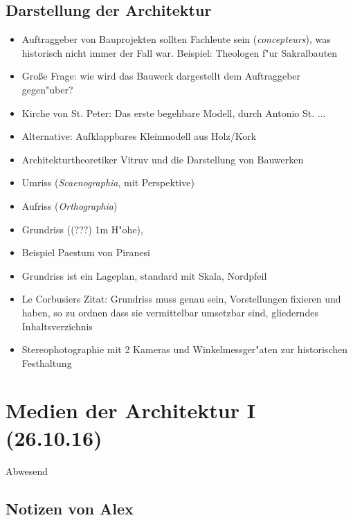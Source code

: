 \documentclass[emulatestandardclasses]{scrartcl}
\begin{document}
\subsection{Darstellung der Architektur}

\begin{itemize}
    \item Auftraggeber von Bauprojekten sollten Fachleute sein (\emph{concepteurs}), was historisch nicht immer der Fall war. Beispiel: Theologen f"ur Sakralbauten
    \item Gro\ss e Frage: wie wird das Bauwerk dargestellt dem Auftraggeber gegen"uber?
    \item Kirche von St. Peter: Das erste begehbare Modell, durch Antonio St. ... 
    \item Alternative: Aufklappbares Kleinmodell aus Holz/Kork
    \item Architekturtheoretiker Vitruv und die Darstellung von Bauwerken
    \item Umriss (\emph{Scaenographia}, mit Perspektive)
    \item Aufriss (\emph{Orthographia})
    \item Grundriss ({\color{red}(???)} 1m H"ohe),
    \item Beispiel Paestum von Piranesi
    \item Grundriss ist ein Lageplan, standard mit Skala, Nordpfeil
    \item Le Corbusiers Zitat: Grundriss muss genau sein, Vorstellungen fixieren und haben, so zu ordnen dass sie vermittelbar umsetzbar sind, gliederndes Inhaltsverzichnis
    \item Stereophotographie mit 2 Kameras und Winkelmessger"aten zur historischen Festhaltung 
\end{itemize}


\section{Medien der Architektur I\\(26.10.16)}

Abwesend

\subsection{Notizen von Alex}
\end{document}
